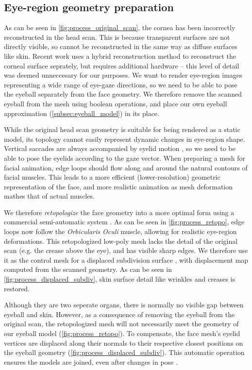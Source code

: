 \subsection{Eye-region geometry preparation}

As can be seen in \autoref{fig:process_original_scan}, the cornea has been incorrectly reconstructed in the head scan. This is because transparent surfaces are not directly visible, so cannot be reconstructed in the same way as diffuse surfaces like skin. Recent work uses a hybrid reconstruction method to reconstruct the corneal surface seprately, but requires additional hardware \cite{berard2014highquality} -- this level of detail was deemed unneccesary for our purposes. We want to render eye-region images representing a wide range of eye-gaze directions, so we need to be able to pose the eyeball separately from the face geometry. We therefore remove the scanned eyeball from the mesh using boolean operations, and place our own eyeball approximation (\autoref{subsec:eyeball_model}) in its place.

While the original head scan geometry is suitable for being rendered as a static model, its topology cannot easily represent dynamic changes in eye-region shape. Vertical saccades are always accompanied by eyelid motion \cite{liversedge2011oxford}, so we need to be able to pose the eyelids according to the gaze vector. When preparing a mesh for facial animation, edge loops should flow along and around the natural contours of facial muscles. This leads to a more efficient (lower-resolution) geometric representation of the face, and more realistic animation as mesh deformation mathes that of actual muscles.

We therefore \emph{retopologize} the face geometry into a more optimal form using a commercial semi-automatic system \cite{ZRemesher}.  As can be seen in \autoref{fig:process_retopo}, edge loops now follow the \emph{Orbicularis Oculi} muscle, allowing for realistic eye-region deformations. This retopologized low-poly mesh lacks the detail of the original scan (e.g. the crease above the eye), and has visible sharp edges. We therefore use it as the control mesh for a displaced subdivision surface \cite{lee2000displaced}, with displacement map computed from the scanned geometry. As can be seen in \autoref{fig:process_displaced_subdiv}, skin surface detail like wrinkles and creases is  restored.

Although they are two seperate organs, there is normally no visible gap between eyeball and skin. However, as a consequence of removing the eyeball from the original scan, the retopologized mesh will not necessarily meet the geometry of our eyeball model (\autoref{fig:process_retopo}). To compensate, the face mesh's eyelid vertices are displaced along their normals to their respective closest positions on the eyeball geometry (\autoref{fig:process_displaced_subdiv}). This automatic operation ensures the models are joined, even after changes in pose \cite{Shrinkwrap}.

